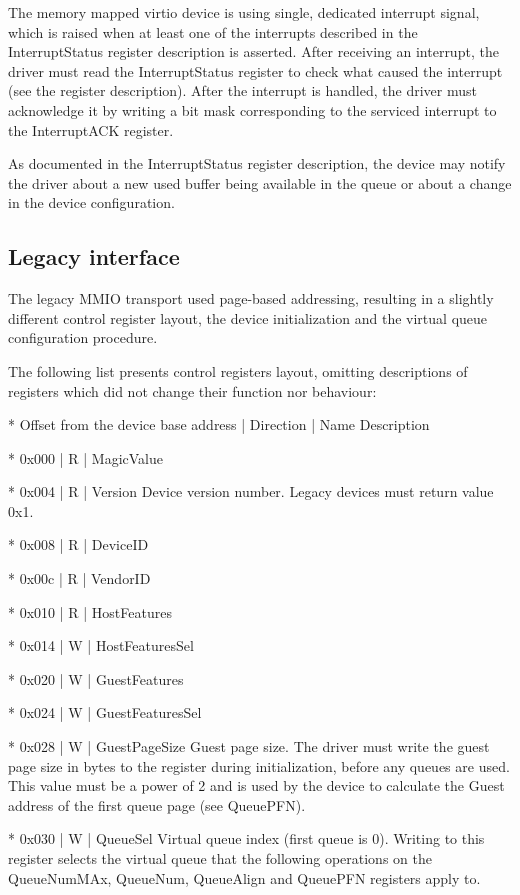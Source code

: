 The memory mapped virtio device is using single, dedicated
interrupt signal, which is raised when at least one of the
interrupts described in the InterruptStatus register
description is asserted. After receiving an interrupt, the
driver must read the InterruptStatus register to check what
caused the interrupt (see the register description). After the
interrupt is handled, the driver must acknowledge it by writing
a bit mask corresponding to the serviced interrupt to the
InterruptACK register.

As documented in the InterruptStatus register description,
the device may notify the driver about a new used buffer being
available in the queue or about a change in the device
configuration.

\subsection{Legacy interface}\label{sec:Virtio Transport Options / Virtio Over MMIO / Legacy interface}

The legacy MMIO transport used page-based addressing, resulting
in a slightly different control register layout, the device
initialization and the virtual queue configuration procedure.

The following list presents control registers layout, omitting
descriptions of registers which did not change their function
nor behaviour:

* Offset from the device base address | Direction | Name
  Description

* 0x000 | R | MagicValue

* 0x004 | R | Version
  Device version number. Legacy devices must return value 0x1.

* 0x008 | R | DeviceID

* 0x00c | R | VendorID

* 0x010 | R | HostFeatures

* 0x014 | W | HostFeaturesSel

* 0x020 | W | GuestFeatures

* 0x024 | W | GuestFeaturesSel

* 0x028 | W | GuestPageSize
  Guest page size.
  The driver must write the guest page size in bytes to the
  register during initialization, before any queues are used.
  This value must be a power of 2 and is used by the device to
  calculate the Guest address of the first queue page
  (see QueuePFN).

* 0x030 | W | QueueSel
  Virtual queue index (first queue is 0).
  Writing to this register selects the virtual queue that the
  following operations on the QueueNumMAx, QueueNum, QueueAlign
  and QueuePFN registers apply to.


